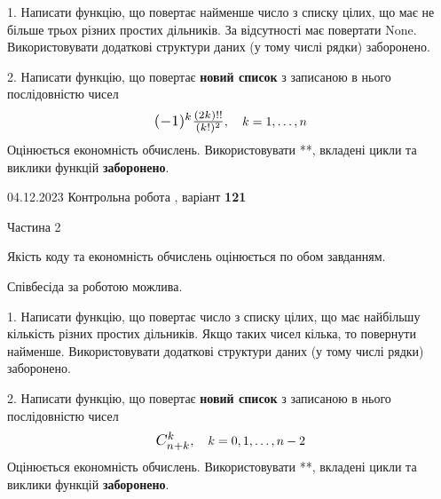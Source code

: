 \documentclass[12pt, ukrainian]{article}
\begin{document}
{{{{{{{{{{{{{{{{{{{{\begin {Large}
1. Написати функцію, що повертає найменше число з списку цілих, що має не більше трьох різних простих дільників. За відсутності має повертати None. Використовувати додаткові структури даних (у тому числі рядки) заборонено.

\vspace{10mm}



2. 
Написати функцію, що повертає \textbf{новий список} з записаною в нього послідовністю чисел
$$\scalebox{1.2}{$(-1)^{k}\frac{(2k)!!}{(k!)^2}$}, \quad k=1,\ldots,n$$
Оцінюється економність обчислень. Використовувати **, вкладені цикли та виклики функцій \textbf{заборонено}.

\end{Large}\newpage




\begin {Huge}
{{04.12.2023 Контрольна робота , варіант  \No \textbf { 121 }\par}}

\begin{center}Частина 2
\end{center}
\vspace{10mm}
\end {Huge}

{
\begin {Large}
Якість коду та економність обчислень оцінюється по обом завданням.

Співбесіда за роботою можлива.

\vspace{5mm}

1. Написати функцію, що повертає число з списку цілих, що має найбільшу кількість різних простих дільників. Якщо таких чисел кілька, то повернути найменше. Використовувати додаткові структури даних (у тому числі рядки) заборонено.

\vspace{10mm}



2. 
Написати функцію, що повертає \textbf{новий список} з записаною в нього послідовністю чисел
$$\scalebox{1.2}{$C_{n+k}^{k}$}, \quad k=0,1,\ldots,n-2$$
Оцінюється економність обчислень. Використовувати **, вкладені цикли та виклики функцій \textbf{заборонено}.

\end{Large}\newpage

}}}}}}}}}}}}}}}}}}}}}
\end{document}
